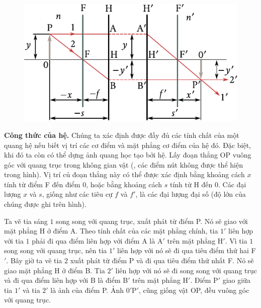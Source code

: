 \begin{figure}[!htb]
	\begin{center}
		\includegraphics[scale=1]{figures/ch_16/fig_16_18.pdf}
        \caption[]{}
		\label{fig:16_18}
	\end{center}
	\vspace{-0.8cm}
\end{figure}

\textbf{Công thức của hệ.}
Chúng ta xác định được đầy đủ các tính chất của một quang hệ nếu biết vị trí các cơ điểm và mặt phẳng cơ điểm của hệ đó.
Đặc biệt, khi đó ta còn có thể dựng ảnh quang học tạo bởi hệ.
Lấy đoạn thẳng OP vuông góc với quang trục trong không gian vật (, các điểm nút không được thể hiện trong hình). Vị trí củ đoạn thẳng này có thể được xác định bằng khoảng cách $x$ tính từ điểm F đến điểm $0$, hoặc bằng khoảng cách $s$ tính từ H đến $0$.
Các đại lượng $x$ và $s$, giống như các tiêu cự $f$ và $f'$, là các đại lượng đại số (độ lớn của chúng được ghi trên hình).

Ta vẽ tia sáng $1$ song song với quang trục, xuất phát từ điểm P.
Nó sẽ giao với mặt phẳng H ở điểm A.
Theo tính chất của các mặt phẳng chính, tia $1'$ liên hợp với tia $1$ phải đi qua điểm liên hợp với điểm A là A$'$ trên mặt phẳng H$'$.
Vì tia $1$ song song với quang trục, nên tia $1'$ liên hợp với nó sẽ đi qua tiêu điểm thứ hai F$'$.
Bây giờ ta vẽ tia $2$ xuất phát từ điểm P và đi qua tiêu điểm thứ nhất F.
Nó sẽ giao mặt phẳng H ở điểm B.
Tia $2'$ liên hợp với nó sẽ đi song song với quang trục và đi qua điểm liên hợp với B là điểm B$'$ trên mặt phẳng H$'$.
Điểm P$'$ giao giữa tia $1'$ và tia $2'$ là ảnh của điểm P.
Ảnh $0'$P$'$, cũng giống vật OP, đều vuông góc với quang trục.

